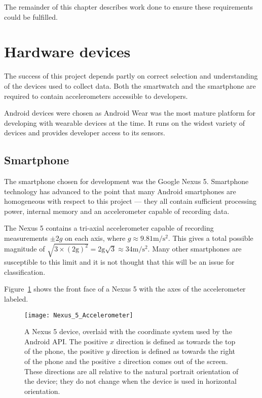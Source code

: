     The remainder of this chapter describes work done to ensure these requirements could be fulfilled.
  
  \section{Hardware devices}
    The success of this project depends partly on correct selection and understanding of the devices
    used to collect data. Both the smartwatch and the smartphone are required to contain accelerometers accessible to
    developers.
    
    Android devices were chosen as Android Wear was the most mature platform for developing with
    wearable devices at the time. It runs on the widest variety of devices and provides developer 
    access to its sensors.
    
    \subsection{Smartphone}
      The smartphone chosen for development was the Google Nexus 5. Smartphone technology has
      advanced to the point that many Android smartphones are homogeneous with respect to this
      project --- they all contain sufficient processing power, internal memory and an 
      accelerometer capable of recording data.
      
      The Nexus 5 contains a tri-axial accelerometer capable of recording measurements $\pm2\si{g}$
      on each axis, where $\si{g} \approx 9.81\si{\metre\per\square\second}$. This gives a total possible magnitude of $\sqrt{3 \times (2\mathrm{g})^2} = 2\mathrm{g}\sqrt{3} \approx 34 \si{\metre\per\square\second}$. Many other smartphones are susceptible to this limit and it is not thought that this will be an issue for classification.
      
      Figure~\ref{fig:nexus-5-accelerometer} shows the front face of a Nexus 5 with the axes of the
      accelerometer labeled.
      
      \begin{figure}[!th]
        \centering
        \texttt{[image: Nexus\_5\_Accelerometer]}
        \caption[A Nexus 5 device, overlaid with the coordinate system used by the Android API.]{A Nexus 5 device, overlaid with the coordinate system used by the Android API. The positive $x$ direction is defined as towards the top of the phone, the positive $y$ direction is defined as towards the right of the phone and the positive $z$ direction comes out of the screen. These directions are all relative to the natural portrait orientation of the device; they do not change when the device is used in horizontal orientation.}
        \label{fig:nexus-5-accelerometer}
      \end{figure}
      
